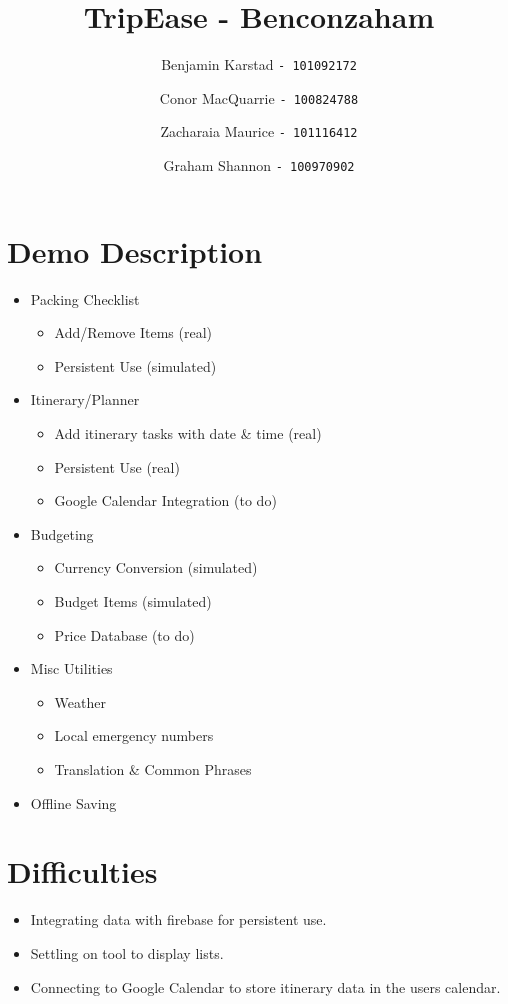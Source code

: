 \documentclass[12pt]{article}
\title{TripEase - Benconzaham}
\author{
Benjamin Karstad
\texttt{- 101092172}
\and
Conor MacQuarrie
\texttt{- 100824788}
\and
Zacharaia Maurice
\texttt{- 101116412}
\and
Graham Shannon
\texttt{- 100970902}
}
\begin{document}
	\maketitle

	\pagebreak

	\section*{Demo Description}

	\begin{itemize}

		\item{Packing Checklist}
		\begin{itemize}
			\item Add/Remove Items (real)
			\item Persistent Use (simulated)
		\end{itemize}

		\item{Itinerary/Planner}
		\begin{itemize}
			\item Add itinerary tasks with date & time (real)
			\item Persistent Use (real)
			\item Google Calendar Integration (to do)
		\end{itemize}

		\item{Budgeting}
			\begin{itemize}
				\item Currency Conversion (simulated)
				\item Budget Items (simulated)
				\item Price Database (to do)
			\end{itemize}

		\item{Misc Utilities}

		\begin{itemize}
			\item Weather
			\item Local emergency numbers
			\item Translation \& Common Phrases
		\end{itemize}

		\item{Offline Saving}

	\end{itemize}
	
	\section*{Difficulties}
	\begin{itemize}
		\item Integrating data with firebase for persistent use.
		\item Settling on tool to display lists.
		\item Connecting to Google Calendar to store itinerary data in the users calendar.
	\end{itemize}
	
\end{document}
